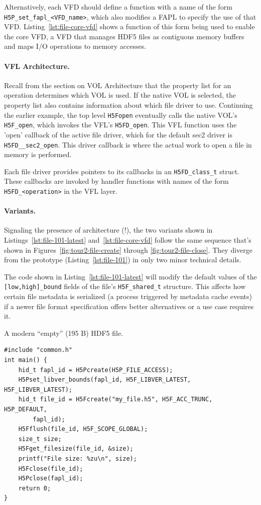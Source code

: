 Alternatively, each VFD should define a function with a name of the form \texttt{H5P\_set\_fapl\_<VFD\_name>}, which also modifies a FAPL to specify the use of that VFD. Listing~\ref{lst:file-core-vfd} shows a function of this form being used to enable the core VFD, a VFD that manages HDF5 files as contiguous memory buffers and maps I/O operations to memory accesses.

\paragraph{VFL Architecture.} Recall from the section on VOL Architecture that the property list for an operation determines which VOL is used. If the native VOL is selected, the property list also contains information about which file driver to use. Continuing the earlier example, the top level \texttt{H5Fopen} eventually calls the native VOL's \texttt{H5F\_open}, which invokes the VFL's \texttt{H5FD\_open}. This VFL function uses the 'open' callback of the active file driver, which for the default sec2 driver is \texttt{H5FD\_\_sec2\_open}. This driver callback is where the actual work to open a file in memory is performed. 

Each file driver provides pointers to its callbacks in an \texttt{H5FD\_class\_t} struct. These callbacks are invoked by handler functions with names of the form \texttt{H5FD\_<operation>} in the VFL layer. %

\paragraph{Variants.} Signaling the presence of architecture (!), the two variants shown in Listings~\ref{lst:file-101-latest} and~\ref{lst:file-core-vfd} follow the same sequence that's shown in Figures~\ref{fig:tour2-file-create} through \ref{fig:tour2-file-close}. They diverge from the prototype (Listing~\ref{lst:file-101}) in only two minor technical details.

The code shown in Listing~\ref{lst:file-101-latest} will modify the default values of the \texttt{[low,high]\_bound} fields of the file's \texttt{H5F\_shared\_t} structure. This affects how certain file metadata is serialized (a process triggered by metadata cache events) if a newer file format specification offers better alternatives or a use case requires it.

\begin{listing}
\centering
\caption{A modern ``empty'' (195 B) HDF5 file.}
\label{lst:file-101-latest}
\begin{verbatim}
#include "common.h"
int main() {
    hid_t fapl_id = H5Pcreate(H5P_FILE_ACCESS);
    H5Pset_libver_bounds(fapl_id, H5F_LIBVER_LATEST, H5F_LIBVER_LATEST);
    hid_t file_id = H5Fcreate("my_file.h5", H5F_ACC_TRUNC, H5P_DEFAULT,
        fapl_id);
    H5Fflush(file_id, H5F_SCOPE_GLOBAL);
    size_t size;
    H5Fget_filesize(file_id, &size);
    printf("File size: %zu\n", size);
    H5Fclose(file_id);
    H5Pclose(fapl_id);
    return 0;
}
\end{verbatim}
\end{listing}

